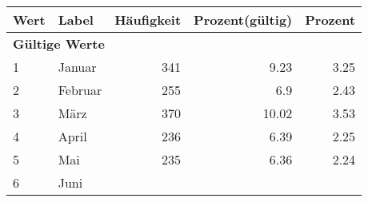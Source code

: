      \begin{longtable}{lXrrr}
     \toprule
     \textbf{Wert} & \textbf{Label} & \textbf{Häufigkeit} & \textbf{Prozent(gültig)} & \textbf{Prozent} \\
     \endhead
     \midrule
     \multicolumn{5}{l}{\textbf{Gültige Werte}}\\

     1 &
     \multicolumn{1}{X}{ Januar   } &


       \num{341} &
       \num[round-mode=places,round-precision=2]{9.23} &
         \num[round-mode=places,round-precision=2]{3.25} \\

     2 &
     \multicolumn{1}{X}{ Februar   } &


       \num{255} &
       \num[round-mode=places,round-precision=2]{6.9} &
         \num[round-mode=places,round-precision=2]{2.43} \\

     3 &
     \multicolumn{1}{X}{ März   } &


       \num{370} &
       \num[round-mode=places,round-precision=2]{10.02} &
         \num[round-mode=places,round-precision=2]{3.53} \\

     4 &
     \multicolumn{1}{X}{ April   } &


       \num{236} &
       \num[round-mode=places,round-precision=2]{6.39} &
         \num[round-mode=places,round-precision=2]{2.25} \\

     5 &
     \multicolumn{1}{X}{ Mai   } &


       \num{235} &
       \num[round-mode=places,round-precision=2]{6.36} &
         \num[round-mode=places,round-precision=2]{2.24} \\

     6 &
     \multicolumn{1}{X}{ Juni   } &



\end{longtable}
